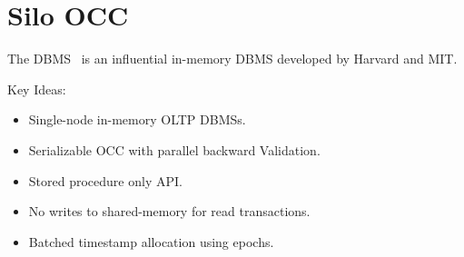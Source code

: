 \documentclass[11pt]{article}
\begin{document}
\section{Silo OCC}
The  DBMS~\cite{tu-sosp2013} is an influential in-memory DBMS developed by Harvard and 
MIT.

Key Ideas:
\begin{itemize}
    \item Single-node in-memory OLTP DBMSs.
    \item Serializable OCC with parallel backward Validation.
    \item Stored procedure only API.
    \item No writes to shared-memory for read transactions.
    \item Batched timestamp allocation using epochs.
\end{itemize}
\end{document}
